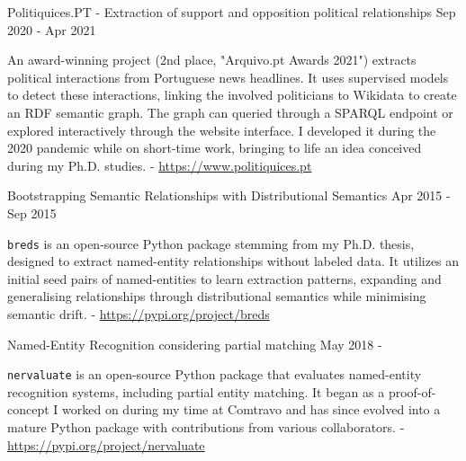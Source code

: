 

\begin{cventries}
  \cvproject
    {} %
	{Politiquices.PT - Extraction of support and opposition political relationships} %
    {} %
    {Sep 2020 - Apr 2021} %
    {
      \begin{cvitems} %
		  \item{An award-winning project (2nd place, "Arquivo.pt Awards 2021") extracts political interactions from Portuguese news headlines. It uses supervised models to detect these interactions, linking the involved politicians to Wikidata to create an RDF semantic graph. The graph can queried through a SPARQL endpoint or explored interactively through the website interface. I developed it during the 2020 pandemic while on short-time work, bringing to life an idea conceived during my Ph.D. studies. - \url{https://www.politiquices.pt}}
      \end{cvitems}
    }
\end{cventries}

\begin{cventries}
 \cvproject
   {} %
   {Bootstrapping Semantic Relationships with Distributional Semantics} %
   {} %
   {Apr 2015 - Sep 2015} %
   {
     \begin{cvitems} %
		\item {\texttt{breds} is an open-source Python package stemming from my Ph.D. thesis, designed to extract named-entity relationships without labeled data. It utilizes an initial seed pairs of named-entities to learn extraction patterns, expanding and generalising relationships through distributional semantics while minimising semantic drift. - \url{https://pypi.org/project/breds}}
     \end{cvitems}
   }
\end{cventries}

\begin{cventries}
 \cvproject
   {} %
   {Named-Entity Recognition considering partial matching} %
   {} %
   {May 2018 - } %
   {
     \begin{cvitems} %
     	\item {\texttt{nervaluate} is an open-source Python package that evaluates named-entity recognition systems, including partial entity matching. It began as a proof-of-concept I worked on during my time at Comtravo and has since evolved into a mature Python package with contributions from various collaborators. - \url{https://pypi.org/project/nervaluate}}
     \end{cvitems}
   }
\end{cventries}
